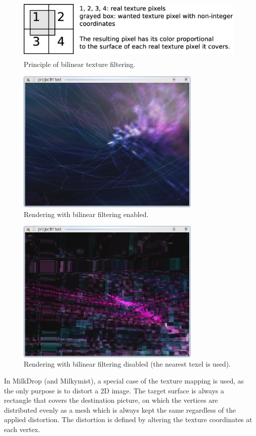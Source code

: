 \documentclass[a4paper,11pt]{kthesis}
\begin{document}
\begin{figure}
\centering
\includegraphics[height=30mm]{bilinear.eps}
\caption{Principle of bilinear texture filtering.}
\label{fig:bilinear}
\end{figure}

\begin{figure}
\centering
\includegraphics[height=70mm]{mdbilin.eps}
\caption{Rendering with bilinear filtering enabled.}
\label{fig:mdbilin}
\end{figure}

\begin{figure}
\centering
\includegraphics[height=70mm]{mdnearest.eps}
\caption{Rendering with bilinear filtering disabled (the nearest texel is used).}
\label{fig:mdnearest}
\end{figure}

In MilkDrop (and Milkymist), a special case of the texture mapping is used, as the only purpose is to distort a 2D image. The target surface is always a rectangle that covers the destination picture, on which the vertices are distributed evenly as a mesh which is always kept the same regardless of the applied distortion. The distortion is defined by altering the texture coordinates at each vertex.
\end{document}
